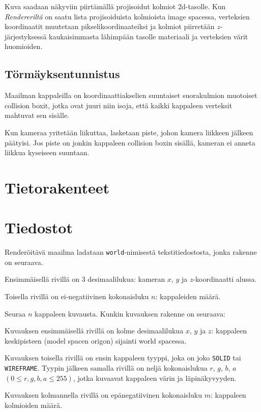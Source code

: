 \documentclass[12pt] {article}
\begin{document}
Kuva saadaan näkyviin piirtämällä projisoidut kolmiot 2d-tasolle. Kun \textit{Rendereriltä} on saatu lista projisoiduista kolmioista image spacessa, verteksien koordinaatit muutetaan pikselikoordinaateiksi ja kolmiot piirretään $z$-järjestyksessä kaukaisimmasta lähimpään tasolle materiaali ja verteksien värit huomioiden.

\subsection {Törmäyksentunnistus}

Maailman kappaleilla on koordinaattiakselien suuntaiset suorakulmion muotoiset collision boxit, jotka ovat juuri niin isoja, että kaikki kappaleen verteksit mahtuvat sen sisälle.

Kun kameraa yritetään liikuttaa, lasketaan piste, johon kamera liikkeen jälkeen päätyisi. Jos piste on jonkin kappaleen collision boxin sisällä, kameran ei anneta liikkua kyseiseen suuntaan.

\section {Tietorakenteet}

\section {Tiedostot}

Renderöitävä maailma ladataan \texttt{world}-nimisestä tekstitiedostosta, jonka rakenne on seuraava.

Ensimmäisellä rivillä on 3 desimaalilukua: kameran $x$, $y$ ja $z$-koordinaatti alussa.

Toisella rivillä on ei-negatiivinen kokonaisluku $n$: kappaleiden määrä.

Seuraa $n$ kappaleen kuvausta. Kunkin kuvauksen rakenne on seuraava:

Kuvauksen ensimmäisellä rivillä on kolme desimaalilukua $x$, $y$ ja $z$: kappaleen keskipisteen (model spacen origon) sijainti world spacessa.

Kuvauksen toisella rivillä on ensin kappaleen tyyppi, joka on joko \texttt{SOLID} tai \texttt{WIREFRAME}. Tyypin jälkeen samalla rivillä on neljä kokonaislukua $r$, $g$, $b$, $a$ $(0 \leq r, g, b, a \leq 255)$, jotka kuvaavat kappaleen värin ja läpinäkyvyyden.

Kuvauksen kolmannella rivillä on epänegatiivinen kokonaisluku $m$: kappaleen kolmioiden määrä.
\end{document}
